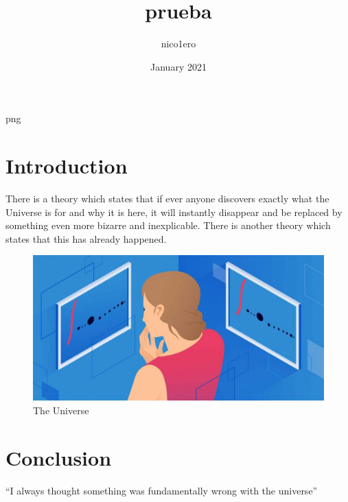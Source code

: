 \documentclass{article}
\title{prueba}
\author{nico1ero }
\date{January 2021}
\begin{document}
\maketitle

   {png}
{}
\section{Introduction}
There is a theory which states that if ever anyone discovers exactly what the Universe is for and why it is here, it will instantly disappear and be replaced by something even more bizarre and inexplicable.
There is another theory which states that this has already happened.

\begin{figure}[h!]
\centering
\includegraphics[scale=1.7]{cuco.jpg}
\caption{The Universe}
\label{fig:universe}
\end{figure}

\section{Conclusion}
``I always thought something was fundamentally wrong with the universe'' \citep{adams1995hitchhiker}



\end{document}

